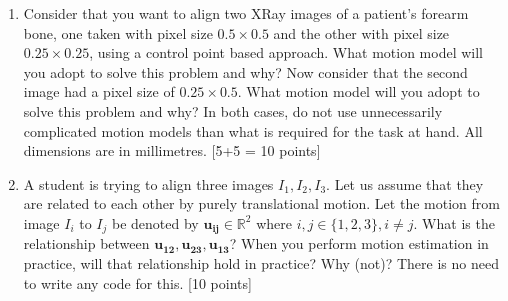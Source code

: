 \documentclass[11pt]{article}
\begin{document}
\begin{enumerate}
\item Consider that you want to align two XRay images of a patient's forearm bone, one taken with pixel size $0.5 \times 0.5$ and the other with pixel size $0.25 \times 0.25$, using a control point based approach.  What motion model will you adopt to solve this problem and why? Now consider that the second image had a pixel size of $0.25 \times 0.5$. What motion model will you adopt to solve this problem and why? In both cases, do not use unnecessarily complicated motion models than what is required for the task at hand. All dimensions are in millimetres. \textsf{[5+5 = 10 points]}

\item A student is trying to align three images $I_1, I_2, I_3$. Let us assume that they are related to each other by purely translational motion. Let the motion from image $I_i$ to $I_j$ be denoted by $\boldsymbol{u_{ij}} \in \mathbb{R}^2$ where $i,j \in \{1,2,3\}, i \neq j$. What is the relationship between $\boldsymbol{u_{12}}, \boldsymbol{u_{23}}, \boldsymbol{u_{13}}$? When you perform motion estimation in practice, will that relationship hold in practice? Why (not)? There is no need to write any code for this. \textsf{[10 points]}


\end{enumerate}
\end{document}
